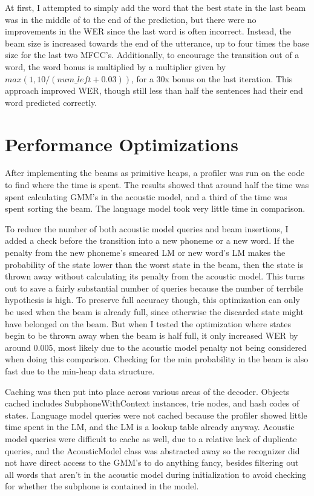 \documentclass[11pt]{article}
\begin{document}
At first, I attempted to simply add the word that the best state in the last beam was in the middle of to the end of the prediction, but there were no improvements in the WER since the last word is often incorrect. Instead, the beam size is increased towards the end of the utterance, up to four times the base size for the last two MFCC's. Additionally, to encourage the transition out of a word, the word bonus is multiplied by a multiplier given by $max(1, 10/(num\_left + 0.03))$, for a 30x bonus on the last iteration. This approach improved WER, though still less than half the sentences had their end word predicted correctly. 

\section{Performance Optimizations}

After implementing the beams as primitive heaps, a profiler was run on the code to find where the time is spent. The results showed that around half the time was spent calculating GMM's in the acoustic model, and a third of the time was spent sorting the beam. The language model took very little time in comparison.

To reduce the number of both acoustic model queries and beam insertions, I added a check before the transition into a new phoneme or a new word. If the penalty from the new phoneme's smeared LM or new word's LM makes the probability of the state lower than the worst state in the beam, then the state is thrown away without calculating its penalty from the acoustic model. This turns out to save a fairly substantial number of queries because the number of terrbile hypothesis is high. To preserve full accuracy though, this optimization can only be used when the beam is already full, since otherwise the discarded state might have belonged on the beam. But when I tested the optimization where states begin to be thrown away when the beam is half full, it only increased WER by around 0.005, most likely due to the acoustic model penalty not being considered when doing this comparison. Checking for the min probability in the beam is also fast due to the min-heap data structure.

Caching was then put into place across various areas of the decoder. Objects cached includes SubphoneWithContext instances, trie nodes, and hash codes of states. Language model queries were not cached because the profiler showed little time spent in the LM, and the LM is a lookup table already anyway. Acoustic model queries were difficult to cache as well, due to a relative lack of duplicate queries, and the AcousticModel class was abstracted away so the recognizer did not have direct access to the GMM's to do anything fancy, besides filtering out all words that aren't in the acoustic model during initialization to avoid checking for whether the subphone is contained in the model.
\end{document}
